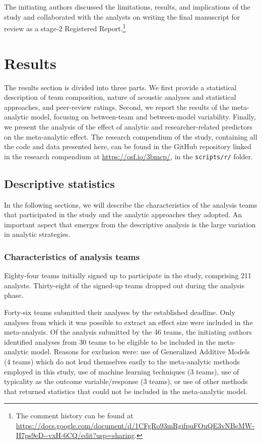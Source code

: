 \documentclass[Review,times,sageh]{sagej}
\begin{document}
The initiating authors discussed the limitations, results, and implications of the study and collaborated with the analysts on writing the final manuscript for review as a stage-2 Registered Report.\footnote{The comment history can be found at \url{https://docs.google.com/document/d/1CFgRo93mRgifpuFOuQE3vNBeMW-H7ps9eD--vxH-6CQ/edit?usp=sharing}.}

\hypertarget{results}{%
\section{Results}\label{results}}

The results section is divided into three parts.
We first provide a statistical description of team composition, nature of acoustic analyses and statistical approaches, and peer-review ratings.
Second, we report the results of the meta-analytic model, focusing on between-team and between-model variability.
Finally, we present the analysis of the effect of analytic and researcher-related predictors on the meta-analytic effect.
The research compendium of the study, containing all the code and data presented here, can be found in the GitHub repository linked in the research compendium at \url{https://osf.io/3bmcp/}, in the \texttt{scripts/r/} folder.

\hypertarget{descr-stats}{%
\subsection{Descriptive statistics}\label{descr-stats}}

In the following sections, we will describe the characteristics of the analysis teams that participated in the study and the analytic approaches they adopted.
An important aspect that emerges from the descriptive analysis is the large variation in analytic strategies.

\hypertarget{characteristics-of-analysis-teams}{%
\subsubsection{Characteristics of analysis teams}\label{characteristics-of-analysis-teams}}

Eighty-four teams initially signed up to participate in the study, comprising 211 analysts.
Thirty-eight of the signed-up teams dropped out during the analysis phase.

Forty-six teams submitted their analyses by the established deadline.
Only analyses from which it was possible to extract an effect size were included in the meta-analysis.
Of the analysis submitted by the 46 teams, the initiating authors identified analyses from 30 teams to be eligible to be included in the meta-analytic model.
Reasons for exclusion were: use of Generalized Additive Models (4 teams) which do not lend themselves easily to the meta-analytic methods employed in this study, use of machine learning techniques (3 teams), use of typicality as the outcome variable/response (3 teams), or use of other methods that returned statistics that could not be included in the meta-analytic model.
\end{document}
